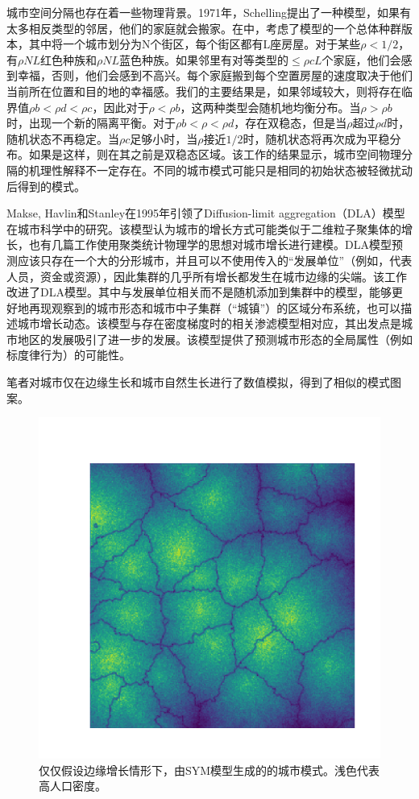 城市空间分隔也存在着一些物理背景。1971年，Schelling提出了一种模型，如果有太多相反类型的邻居，他们的家庭就会搬家。在\cite{Durrett14036}中，考虑了模型的一个总体种群版本，其中将一个城市划分为N个街区，每个街区都有L座房屋。对于某些$\rho <1/2$，有$\rho NL$红色种族和$\rho NL$蓝色种族。如果邻里有对等类型的$≤\rho cL$个家庭，他们会感到幸福，否则，他们会感到不高兴。每个家庭搬到每个空置房屋的速度取决于他们当前所在位置和目的地的幸福感。我们的主要结果是，如果邻域较大，则将存在临界值$\rho b<​​\rho d<\rho c$，因此对于$\rho <\rho b$，这两种类型会随机地均衡分布。当$\rho >\rho b$时，出现一个新的隔离平衡。对于$\rho b<\rho <\rho d$，存在双稳态，但是当$\rho $超过$\rho d$时，随机状态不再稳定。当$\rho c$足够小时，当$\rho $接近$1/2$时，随机状态将再次成为平稳分布。如果是这样，则在其之前是双稳态区域。该工作的结果显示，城市空间物理分隔的机理性解释不一定存在。不同的城市模式可能只是相同的初始状态被轻微扰动后得到的模式。

Makse, Havlin和Stanley在1995年引领了Diffusion-limit aggregation（DLA）模型在城市科学中的研究\cite{MakseModelling}。该模型认为城市的增长方式可能类似于二维粒子聚集体的增长，也有几篇工作\cite{doi:10.1111/j.1538-4632.1991.tb00245.x, BENGUIGUI199513}使用聚类统计物理学的思想对城市增长进行建模。DLA模型预测应该只存在一个大的分形城市，并且可以不使用传入的“发展单位”（例如，代表人员，资金或资源），因此集群的几乎所有增长都发生在城市边缘的尖端。该工作改进了DLA模型。其中与发展单位相关而不是随机添加到集群中的模型，能够更好地再现观察到的城市形态和城市中子集群（“城镇”）的区域分布系统，也可以描述城市增长动态。该模型与存在密度梯度时的相关渗滤模型相对应，其出发点是城市地区的发展吸引了进一步的发展。该模型提供了预测城市形态的全局属性（例如标度律行为）的可能性。

笔者对城市仅在边缘生长和城市自然生长进行了数值模拟，得到了相似的模式图案。
\begin{figure}
  \centering
  \includegraphics[width = \linewidth]{pictures/fractal_41_256.pdf}
  \caption{仅仅假设边缘增长情形下，由SYM模型生成的的城市模式。浅色代表高人口密度。}
\end{figure}

